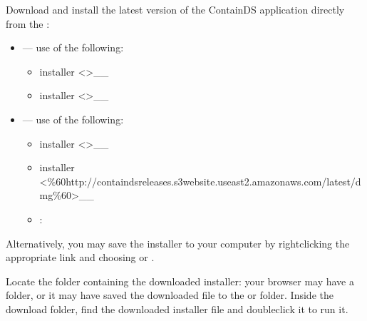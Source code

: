 \documentclass[letterpaper,10pt,english]{sphinxmanual}
\begin{document}
Download and install the latest version of the ContainDS application directly from the :
\begin{itemize}
\item {} 
 — use  of the following:
\begin{itemize}
\item {} 
 installer \textless{}\textgreater{}\textasciigrave{}\_\_

\item {} 
 installer \textless{}\textgreater{}\textasciigrave{}\_\_

\end{itemize}

\item {} 
 — use  of the following:
\begin{itemize}
\item {} 
 installer \textless{}\textgreater{}\textasciigrave{}\_\_

\item {} 
 installer \textless{}\%60http://containdsreleases.s3\sphinxhyphen{}website.us\sphinxhyphen{}east\sphinxhyphen{}2.amazonaws.com/latest/dmg\%60\textgreater{}\textasciigrave{}\_\_

\item {} 
:  

\end{itemize}

\end{itemize}

Alternatively, you may save the installer to your computer by right\sphinxhyphen{}clicking the appropriate link and choosing  or .

Locate the folder containing the downloaded installer: your browser may have a  folder, or it may have saved the downloaded file to the  or  folder. Inside the download folder, find the downloaded installer file and double\sphinxhyphen{}click it to run it.
\end{document}
